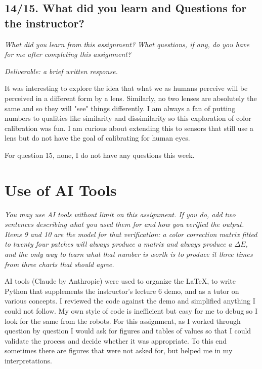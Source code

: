 \documentclass[11pt]{article}
\newcommand{\task}[3]{\subsection*{#1}{\sloppy\noindent\textit{#2}\par}\smallskip\noindent\textit{Deliverable: #3}\par\medskip}
\begin{document}
\task{14/15. What did you learn and Questions for the instructor?}
{What did you learn from this assignment? What questions, if any, do you have for me after completing this assignment?}
{a brief written response.}

It was interesting to explore the idea that what we as humans perceive will be perceived in a different form by a lens.
Similarly, no two lenses are absolutely the same and so they will "see" things differently.
I am always a fan of putting numbers to qualities like similarity and dissimilarity so this exploration of color calibration was fun.
I am curious about extending this to sensors that still use a lens but do not have the goal of calibrating for human eyes.

For question 15, none, I do not have any questions this week.


\section*{Use of AI Tools}
\noindent\textit{You may use AI tools without limit on this assignment. If you do, add two sentences describing what you used them for and how you verified the output. Items 9 and 10 are the model for that verification: a color correction matrix fitted to twenty four patches will always produce a matrix and always produce a $\Delta E$, and the only way to learn what that number is worth is to produce it three times from three charts that should agree.}\par\medskip

AI tools (Claude by Anthropic) were used to organize the \LaTeX, to write Python that supplements the instructor's lecture 6 demo, and as a tutor on various concepts.
I reviewed the code against the demo and simplified anything I could not follow. My own style of code is inefficient but easy for me to debug so I look for the same from the robots.
For this assignment, as I worked through question by question I would ask for figures and tables of values so that I could validate the process and decide whether it was appropriate.
To this end sometimes there are figures that were not asked for, but helped me in my interpretations.
\end{document}
